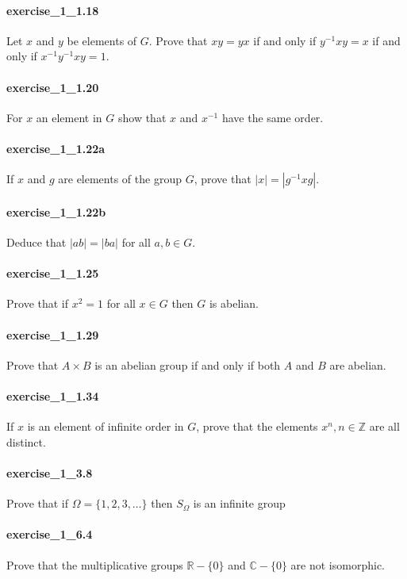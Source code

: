 \documentclass{article}
\begin{document}
\paragraph{exercise\_1\_1.18} Let $x$ and $y$ be elements of $G$. Prove that $xy=yx$ if and only if $y^{-1}xy=x$ if and only if $x^{-1}y^{-1}xy=1$.

\paragraph{exercise\_1\_1.20} For $x$ an element in $G$ show that $x$ and $x^{-1}$ have the same order.

\paragraph{exercise\_1\_1.22a} If $x$ and $g$ are elements of the group $G$, prove that $|x|=\left|g^{-1} x g\right|$.

\paragraph{exercise\_1\_1.22b} Deduce that $|a b|=|b a|$ for all $a, b \in G$.

\paragraph{exercise\_1\_1.25} Prove that if $x^{2}=1$ for all $x \in G$ then $G$ is abelian.

\paragraph{exercise\_1\_1.29} Prove that $A \times B$ is an abelian group if and only if both $A$ and $B$ are abelian.

\paragraph{exercise\_1\_1.34} If $x$ is an element of infinite order in $G$, prove that the elements $x^{n}, n \in \mathbb{Z}$ are all distinct.

\paragraph{exercise\_1\_3.8} Prove that if $\Omega=\{1,2,3, \ldots\}$ then $S_{\Omega}$ is an infinite group

\paragraph{exercise\_1\_6.4} Prove that the multiplicative groups $\mathbb{R}-\{0\}$ and $\mathbb{C}-\{0\}$ are not isomorphic.
\end{document}
